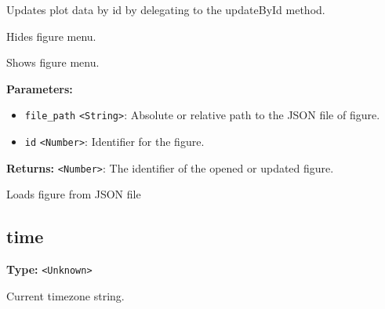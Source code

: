 \documentclass[12pt,a4paper]{article}
\begin{document}
\noindent Updates plot data by id by delegating to the \textasciigrave{}updateById\textasciigrave{} method.

\vspace{5mm}
\noindent {}


\noindent Hides figure menu.

\vspace{5mm}
\noindent {}


\noindent Shows figure menu.

\vspace{5mm}
\noindent {}


\noindent \textbf{Parameters:}
\begin{itemize}
  \item \texttt{file\_path} \texttt{<String>}: Absolute or relative path to the JSON file of figure.
  \item \texttt{id} \texttt{<Number>}: Identifier for the figure.
\end{itemize}

\noindent \textbf{Returns:} \texttt{<Number>}: The identifier of the opened or updated figure.

\noindent Loads figure from JSON file


\subsection{time}
\vspace{5mm}
\noindent {}\vspace{4mm}


\noindent \textbf{Type:} \texttt{<Unknown>}

\noindent Current timezone string.

\vspace{5mm}
\noindent {}\vspace{4mm}
\end{document}
